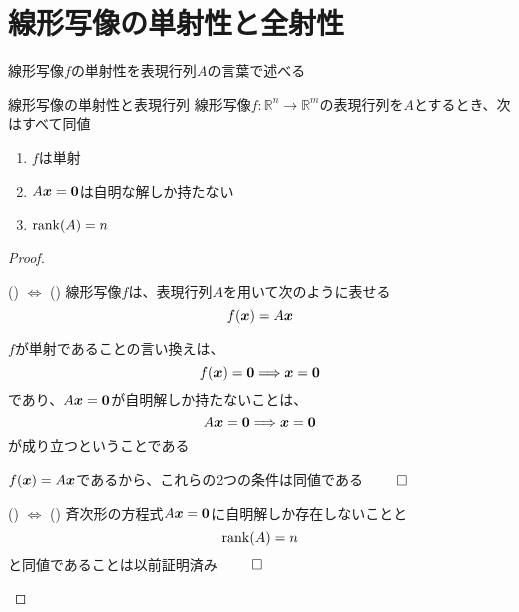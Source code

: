 \documentclass[../../../topic_linear-algebra]{subfiles}
\begin{document}
\sectionline
\section{線形写像の単射性と全射性}

線形写像$f$の単射性を表現行列$A$の言葉で述べる

\begin{theorem}{線形写像の単射性と表現行列}
  線形写像$f\colon \mathbb{R}^n \to \mathbb{R}^m$の表現行列を$A$とするとき、次はすべて同値
  \begin{enumerate}[label=\romanlabel]
    \item $f$は単射
    \item $A\vb*{x} = \vb*{0}$は自明な解しか持たない
    \item $\rank(A) = n$
  \end{enumerate}
\end{theorem}

\begin{proof}
  \begin{subpattern}{() $\Longleftrightarrow$ ()}
    線形写像$f$は、表現行列$A$を用いて次のように表せる
    \begin{equation*}
      f(\vb*{x}) = A\vb*{x}
    \end{equation*}

    $f$が単射であることの言い換えは、
    \begin{equation*}
      f(\vb*{x}) = \vb*{0} \Longrightarrow \vb*{x} = \vb*{0}
    \end{equation*}
    であり、$A\vb*{x} = \vb*{0}$が自明解しか持たないことは、
    \begin{equation*}
      A\vb*{x} = \vb*{0} \Longrightarrow \vb*{x} = \vb*{0}
    \end{equation*}
    が成り立つということである

    $f(\vb*{x}) = A\vb*{x}$であるから、これらの2つの条件は同値である $\qed$
  \end{subpattern}

  \begin{subpattern}{() $\Longleftrightarrow$ ()}
    斉次形の方程式$A\vb*{x} = \vb*{0}$に自明解しか存在しないことと
    \begin{equation*}
      \rank(A) = n
    \end{equation*}
    と同値であることは以前証明済み $\qed$
  \end{subpattern}
\end{proof}
\end{document}
